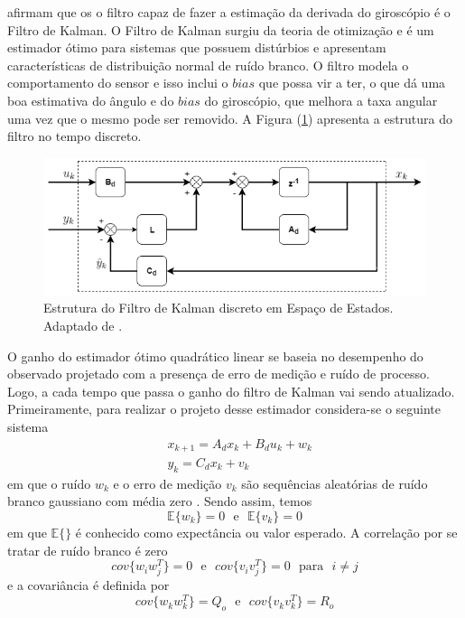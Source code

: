 \cite{Sundin:12} afirmam que os o filtro capaz de fazer a estimação da derivada do giroscópio é o Filtro de Kalman. O Filtro de Kalman surgiu da teoria de otimização e é um estimador ótimo para sistemas que possuem distúrbios e apresentam características de distribuição normal de ruído branco. O filtro modela o comportamento do sensor e isso inclui o $\textit{bias}$ que possa vir a ter, o que dá uma boa estimativa do ângulo e do $\textit{bias}$ do giroscópio, que melhora a taxa angular uma vez que o mesmo pode ser removido. A Figura (\ref{fig:estimadorLQE}) apresenta a estrutura do filtro no tempo discreto.
\begin{figure}[H]
    \centering
    \includegraphics[scale=0.6]{Fundamentos/Kalman}
    \caption{Estrutura do Filtro de Kalman discreto em Espaço de Estados. Adaptado de \cite{Steven:17}.}
    \label{fig:estimadorLQE}
\end{figure}

O ganho do estimador ótimo quadrático linear se baseia no desempenho do observado projetado com a presença de erro de medição e ruído de processo. Logo, a cada tempo que passa o ganho do filtro de Kalman vai sendo atualizado. Primeiramente, para realizar o projeto desse estimador considera-se o seguinte sistema
\begin{equation}\label{eq:SistemaLQE}
    \begin{array}{cc}
         &  x_{k+1} = A_d x_k + B_d u_k + w_k\\[6pt]
         &  y_k = C_dx_k + v_k
    \end{array}{}
\end{equation}{}
em que o ruído $w_k$ e o erro de medição $v_k$ são sequências aleatórias de ruído branco gaussiano com média zero \cite[p. 231]{Sage}. Sendo assim, temos
\begin{equation*}
    \mathbb{E}\{w_k\} = 0 ~~~ \text{e} ~~~ \mathbb{E}\{v_k\} = 0 
\end{equation*}{}
em que $\mathbb{E}\{\}$ é conhecido como expectância ou valor esperado. A correlação por se tratar de ruído branco é zero 
\begin{equation*}
    cov\{w_iw_j^T\} = 0 ~~~ \text{e} ~~~ cov\{v_iv_j^T\} = 0 ~~~ \text{para} ~~~ i \ne j
\end{equation*}{}
e a covariância é definida por
\begin{equation*}
    cov\{w_kw_k^T\} = Q_o ~~~ \text{e} ~~~ cov\{v_kv_k^T\} = R_o
\end{equation*}{}

